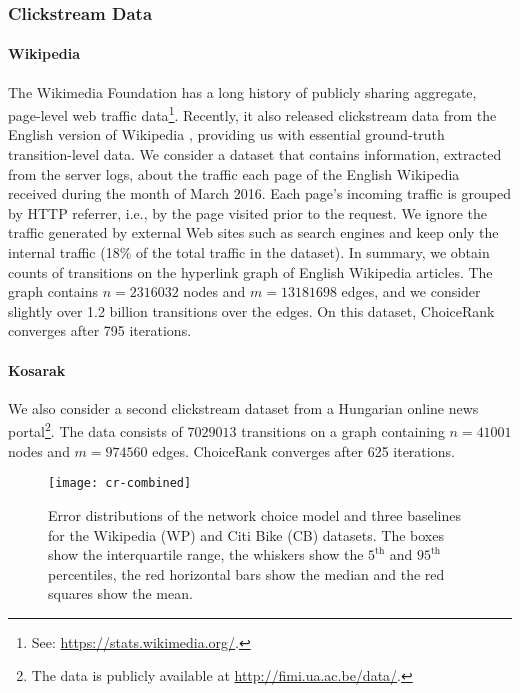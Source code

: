 \subsubsection{Clickstream Data}

\paragraph{Wikipedia}
The Wikimedia Foundation has a long history of publicly sharing aggregate, page-level web traffic data\footnote{See: \url{https://stats.wikimedia.org/}.}.
Recently, it also released clickstream data from the English version of Wikipedia \citep{wulczyn2016wikipedia}, providing us with essential ground-truth transition-level data.
We consider a dataset that contains information, extracted from the server logs, about the traffic each page of the English Wikipedia received during the month of March 2016.
Each page's incoming traffic is grouped by HTTP referrer, i.e., by the page visited prior to the request.
We ignore the traffic generated by external Web sites such as search engines and keep only the internal traffic (\num{18}\% of the total traffic in the dataset).
In summary, we obtain counts of transitions on the hyperlink graph of English Wikipedia articles.
The graph contains $n = \num{2316032}$ nodes and $m = \num{13181698}$ edges, and we consider slightly over \num{1.2} billion transitions over the edges.
On this dataset, ChoiceRank converges after \num{795} iterations.

\paragraph{Kosarak}
We also consider a second clickstream dataset from a Hungarian online news portal\footnote{The data is publicly available at \url{http://fimi.ua.ac.be/data/}.}.
The data consists of $\num{7029013}$ transitions on a graph containing $n = 41001$ nodes and $m = \num{974560}$ edges.
ChoiceRank converges after \num{625} iterations.

\begin{figure*}[t]
  \centering
  \texttt{[image: cr-combined]}
  \caption{
Error distributions of the network choice model and three baselines for the Wikipedia (WP) and Citi Bike (CB) datasets.
The boxes show the interquartile range, the whiskers show the $5^{\text{th}}$ and $95^{\text{th}}$ percentiles, the red horizontal bars show the median and the red squares show the mean.
}
  \label{fig:results}
\end{figure*}

